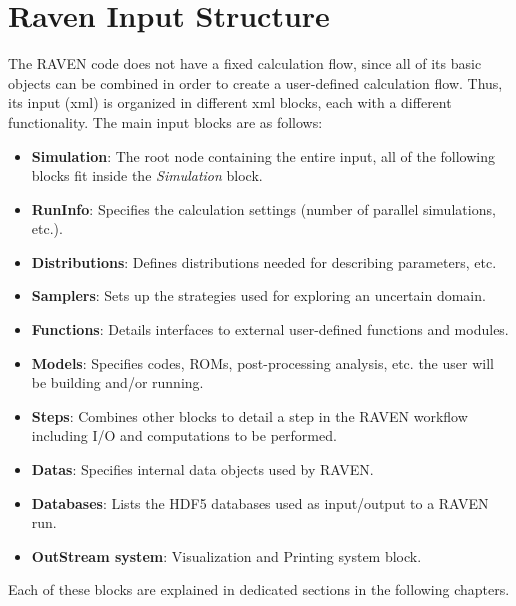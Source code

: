 \section{Raven Input Structure}
The RAVEN code does not have a fixed calculation flow, since all of its basic
objects can be combined in order to create a user-defined calculation flow.
%
Thus, its input (xml) is organized in different xml blocks, each with a
different functionality.
%
The main input blocks are as follows:
\begin{itemize}
\item \textbf{Simulation}: The root node containing the entire input, all of
  the following blocks fit inside the \emph{Simulation} block.
\item \textbf{RunInfo}: Specifies the calculation settings (number of parallel
  simulations, etc.).
\item \textbf{Distributions}: Defines distributions needed for describing
  parameters, etc.
\item \textbf{Samplers}: Sets up the strategies used for exploring an uncertain
  domain.
\item \textbf{Functions}: Details interfaces to external user-defined functions
  and modules.
\item \textbf{Models}: Specifies codes, ROMs, post-processing analysis, etc.
  the user will be building and/or running.
\item \textbf{Steps}: Combines other blocks to detail a step in the RAVEN
  workflow including I/O and computations to be performed.
\item \textbf{Datas}: Specifies internal data objects used by RAVEN.
\item \textbf{Databases}: Lists the HDF5 databases used as input/output to a
  RAVEN run.
\item \textbf{OutStream system}: Visualization and Printing system block.
\end{itemize}

Each of these blocks are explained in dedicated sections in the following
chapters.

